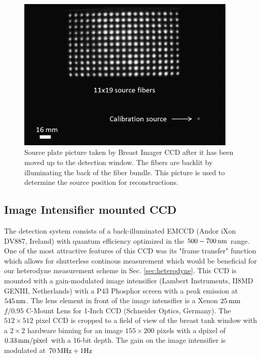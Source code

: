 \begin{figure}[ht]
\begin{center}
\includegraphics[width=10.5cm]{./figures/4_Gen3/srcplatepic2.png}
\caption{Source plate picture taken by Breast Imager CCD after it has been moved up to the detection window. The fibers are backlit by illuminating the back of the fiber bundle. This picture is used to determine the source position for reconstructions.}
\label{fig:srcplatepic}
\end{center}
\end{figure}


\subsection{Image Intensifier mounted CCD}
The detection system consists of a back-illuminated EMCCD (Andor iXon DV887, Ireland) with quantum efficiency optimized in the $500-700\,{\rm nm}$ range. One of the most attractive features of this CCD was its "frame transfer" function which allows for shutterless continous measurement which would be beneficial for our heterodyne measurement scheme in Sec. \ref{sec:heterodyne}. This CCD is mounted with a gain-modulated image intensifier (Lambert Instruments, II8MD GENIII, Netherlands) with a P43 Phosphor screen with a peak emission at $545\, {\rm nm}$. The lens element in front of the image intensifier is a Xenon $25\,{\rm mm}$ $f/0.95$ C-Mount Lens for 1-Inch CCD (Schneider Optics, Germany). The $512 \times 512$ pixel CCD is cropped to a field of view of the breast tank window with a $2 \times 2$ hardware binning for an image $155 \times 200$ pixels with a dpixel of $0.33\, {\rm mm/pixel}$ with a 16-bit depth. The gain on the image intensifier is modulated at  $70\,{\rm MHz} + 1 {\rm Hz}$

